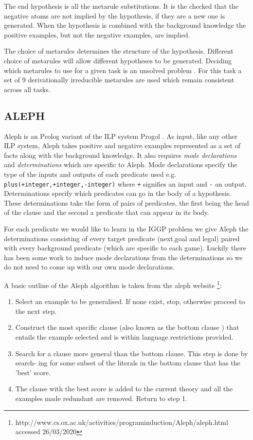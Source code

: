 The end hypothesis is all the metarule substitutions. It is the checked that the negative atoms are not implied by the hypothesis, if they are a new one is generated. When the hypothesis is combined with the background knowledge the positive examples, but not the negative examples, are implied.

The choice of metarules determines the structure of the hypothesis. Different choice of metarules will allow different hypotheses to be generated. Deciding which metarules to use for a given task is an unsolved problem \cite{Cropper/Thesis}. For this task a set of 9 derivationally irreducible metarules are used which remain consistent across all tasks.
\subsection{ALEPH}\label{sec:aleph}
Aleph is an Prolog variant of the ILP system Progol \cite{Muggleton/Aleph}. As input, like any other ILP system, Aleph takes positive and negative examples represented as a set of facts along with the background knowledge. It also requires \textit{mode declarations} and \textit{determinations} which are specific to Aleph. Mode declarations specify the type of the inputs and outputs of each predicate used e.g. \texttt{plus(+integer,+integer,-integer)} where \texttt{+} signifies an input and \texttt{-} an output.
Determinations specify which predicates can go in the body of a hypothesis. These determinations take the form of pairs of predicates, the first being the head of the clause and the second a predicate that can appear in its body.

For each predicate we would like to learn in the IGGP problem we give Aleph the determinations consisting of every target predicate (next,goal and legal) paired with every background predicate (which are specific to each game). Luckily there has been some work to induce mode declarations from the determinations \cite{McCreath/Meta-extraction} so we do not need to come up with our own mode declarations.

A basic outline of the Aleph algorithm is taken from the aleph website \footnote{http://www.cs.ox.ac.uk/activities/programinduction/Aleph/aleph.html accessed 26/03/2020}:
\begin{enumerate}
\item Select an example to be generalised. If none exist, stop, otherwise proceed to the
next step.
\item Construct the most specific clause (also known as the bottom clause \cite{Muggleton/Aleph}) that entails
the example selected and is within language restrictions provided.
\item Search for a clause more general than the bottom clause. This step is done by search-
ing for some subset of the literals in the bottom clause that has the 'best' score.
\item The clause with the best score is added to the current theory and all the examples
made redundant are removed. Return to step 1.
\end{enumerate}

